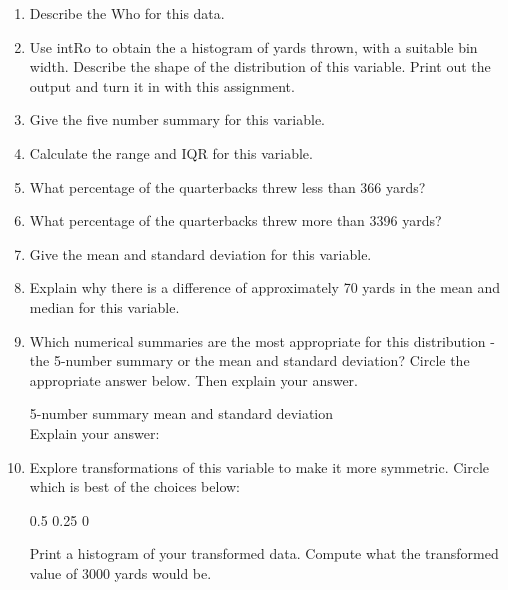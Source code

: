 \documentclass{article}[11pt]
\begin{document}
\begin{enumerate}
\begin{enumerate}
\item Describe the Who for this data.\\[0.35in]
\item Use intRo to obtain the a histogram of yards thrown, with a suitable bin width.  Describe the shape of the distribution of this variable. Print out the output and turn it in with this assignment.
\item Give the five number summary for this variable.\\[0.2in]
\item Calculate the range and IQR for this variable.\\[0.1in]
\item What percentage of the quarterbacks  threw less than 366 yards? \\[0.1in]
\item What percentage of the quarterbacks  threw more than 3396 yards?  \\[0.1in]
\item Give the mean and standard deviation for this variable.\\[0.1in]
\item Explain why there is a difference of approximately 70 yards in the mean and median for this variable.\\[1in]
\item Which numerical summaries are the most appropriate for this distribution - the 5-number summary or the mean and standard deviation?  Circle the appropriate answer below.  Then explain your answer.

\hspace{1in} 5-number summary \hspace{1in} mean and standard deviation \\[0.5em]

Explain your answer:\\[0.5in]
\item Explore transformations of this variable to make it more symmetric. Circle which is best of the choices below:

\hspace{1in} 0.5 \hspace{1in} 0.25 \hspace{1in} 0

Print a histogram of your transformed data. Compute what the transformed value of 3000 yards would be. 

\end{enumerate}

\end{enumerate}
\end{document}
